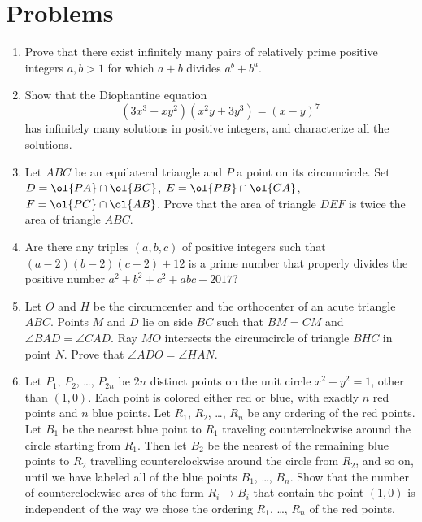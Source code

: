 \documentclass[11pt]{scrartcl}
\begin{document}
\section{Problems}
\begin{enumerate}[\bfseries 1.]
\item %
Prove that there exist infinitely many pairs of
relatively prime positive integers $a,b > 1$
for which $a+b$ divides $a^b+b^a$.

\item %
Show that the Diophantine equation
\[ \left( 3x^3+xy^2 \right)\left( x^2y+3y^3 \right) = (x-y)^7 \]
has infinitely many solutions in positive integers,
and characterize all the solutions.

\item %
Let $ABC$ be an equilateral triangle and $P$
a point on its circumcircle.
Set $D = \ol{PA} \cap \ol{BC}$, $E = \ol{PB} \cap \ol{CA}$,
$F = \ol{PC} \cap \ol{AB}$.
Prove that the area of triangle $DEF$ is
twice the area of triangle $ABC$.

\item %
Are there any triples $(a,b,c)$ of positive integers such that
$(a-2)(b-2)(c-2)+12$ is a prime number
that properly divides the positive number
$a^2+b^2+c^2+abc-2017$?

\item %
Let $O$ and $H$ be the circumcenter
and the orthocenter of an acute triangle $ABC$.
Points $M$ and $D$ lie on side $BC$
such that $BM=CM$ and $\angle BAD = \angle CAD$.
Ray $MO$ intersects the circumcircle of triangle $BHC$ in point $N$.
Prove that $\angle ADO = \angle HAN$.

\item %
Let $P_1$, $P_2$, \dots, $P_{2n}$ be $2n$ distinct points on the
unit circle $x^2+y^2=1$, other than $(1,0)$.
Each point is colored either red or blue,
with exactly $n$ red points and $n$ blue points.
Let $R_1$, $R_2$, \dots, $R_n$ be any ordering of the red points.
Let $B_1$ be the nearest blue point to $R_1$ traveling
counterclockwise around the circle starting from $R_1$.
Then let $B_2$ be the nearest of the remaining blue points to $R_2$
travelling counterclockwise around the circle from $R_2$, and so on,
until we have labeled all of the blue points $B_1$, \dots, $B_n$.
Show that the number of counterclockwise arcs of the form $R_i \to B_i$
that contain the point $(1,0)$ is independent of the way we chose the
ordering $R_1$, \dots, $R_n$ of the red points.

\end{enumerate}
\pagebreak
\end{document}

